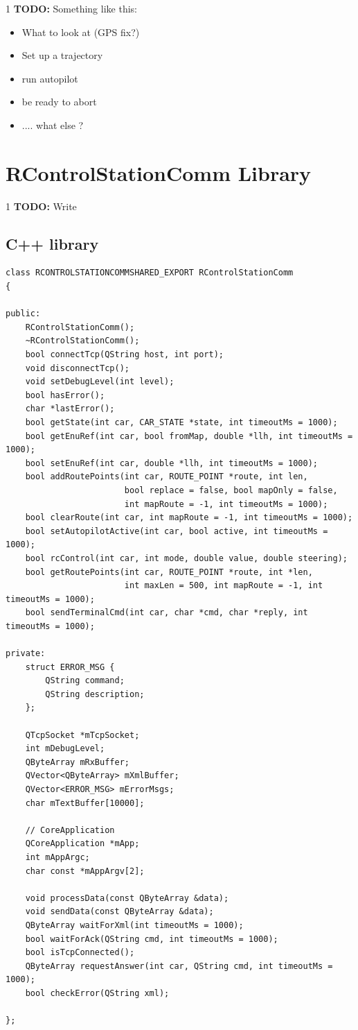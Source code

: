 \documentclass[12pt]{article} %
\def\printtodos{0}
\newcommand{\todo}[1]{
  \if\printtodos1
      {\color{red} \textbf{TODO:} #1}
  \fi}
\begin{document}
\todo{Something like this:}
\begin{itemize}
\item What to look at (GPS fix?)
\item Set up a trajectory
\item run autopilot
\item be ready to abort
\item .... what else ? 
\end{itemize} 





\section{RControlStationComm Library}\label{sec:comm}

\todo{Write}
\subsection{C++ library}

\begin{Verbatim}
class RCONTROLSTATIONCOMMSHARED_EXPORT RControlStationComm
{

public:
    RControlStationComm();
    ~RControlStationComm();
    bool connectTcp(QString host, int port);
    void disconnectTcp();
    void setDebugLevel(int level);
    bool hasError();
    char *lastError();
    bool getState(int car, CAR_STATE *state, int timeoutMs = 1000);
    bool getEnuRef(int car, bool fromMap, double *llh, int timeoutMs = 1000);
    bool setEnuRef(int car, double *llh, int timeoutMs = 1000);
    bool addRoutePoints(int car, ROUTE_POINT *route, int len,
                        bool replace = false, bool mapOnly = false,
                        int mapRoute = -1, int timeoutMs = 1000);
    bool clearRoute(int car, int mapRoute = -1, int timeoutMs = 1000);
    bool setAutopilotActive(int car, bool active, int timeoutMs = 1000);
    bool rcControl(int car, int mode, double value, double steering);
    bool getRoutePoints(int car, ROUTE_POINT *route, int *len,
                        int maxLen = 500, int mapRoute = -1, int timeoutMs = 1000);
    bool sendTerminalCmd(int car, char *cmd, char *reply, int timeoutMs = 1000);

private:
    struct ERROR_MSG {
        QString command;
        QString description;
    };

    QTcpSocket *mTcpSocket;
    int mDebugLevel;
    QByteArray mRxBuffer;
    QVector<QByteArray> mXmlBuffer;
    QVector<ERROR_MSG> mErrorMsgs;
    char mTextBuffer[10000];

    // CoreApplication
    QCoreApplication *mApp;
    int mAppArgc;
    char const *mAppArgv[2];

    void processData(const QByteArray &data);
    void sendData(const QByteArray &data);
    QByteArray waitForXml(int timeoutMs = 1000);
    bool waitForAck(QString cmd, int timeoutMs = 1000);
    bool isTcpConnected();
    QByteArray requestAnswer(int car, QString cmd, int timeoutMs = 1000);
    bool checkError(QString xml);

};
\end{Verbatim}
\end{document}
